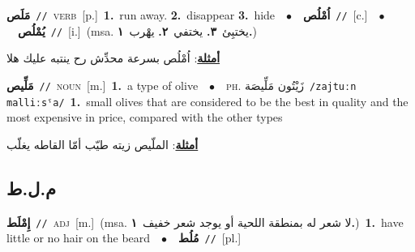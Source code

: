 \documentclass[10pt,a4paper,twoside]{article} %
\begin{document}
\begin{multicols}{2}
{\setlength\topsep{0pt}\textbf{\foreignlanguage{arabic}{مَلَص}}\ {\color{gray}\texttt{//}\color{black}}\ \textsc{verb}\ [p.]\ \textbf{1.}~run away.  \textbf{2.}~disappear  \textbf{3.}~hide\ \ $\bullet$\ \ \setlength\topsep{0pt}\textbf{\foreignlanguage{arabic}{اُمْلُص}}\ {\color{gray}\texttt{//}\color{black}}\ [c.]\ \ $\bullet$\ \ \setlength\topsep{0pt}\textbf{\foreignlanguage{arabic}{يُمْلُص}}\ {\color{gray}\texttt{//}\color{black}}\ [i.]\ \color{gray}(msa. \foreignlanguage{arabic}{يختبِئ}~\foreignlanguage{arabic}{\textbf{٣.}}  \foreignlanguage{arabic}{يختفي}~\foreignlanguage{arabic}{\textbf{٢.}}  \foreignlanguage{arabic}{يهْرب}~\foreignlanguage{arabic}{\textbf{١.}})\color{black}\  \begin{flushright}\color{gray}\foreignlanguage{arabic}{\textbf{\underline{\foreignlanguage{arabic}{أمثلة}}}: اُمْلُص بسرعة محدِّش رح ينتبه عليك هلا}\end{flushright}\color{black}} \vspace{2mm}

{\setlength\topsep{0pt}\textbf{\foreignlanguage{arabic}{مَلِّيص}}\ {\color{gray}\texttt{//}\color{black}}\ \textsc{noun}\ [m.]\ \textbf{1.}~a type of olive\ \ $\bullet$\ \ \textsc{ph.} \color{gray} \foreignlanguage{arabic}{زَيْتُون مَلِّيصَة}\color{black}\ {\color{gray}\texttt{/{\sffamily zajtuːn malliːsˤa}/}\color{black}}\ \textbf{1.}~small olives that are considered to be the best in quality and the most expensive in price, compared with the other types\  \begin{flushright}\color{gray}\foreignlanguage{arabic}{\textbf{\underline{\foreignlanguage{arabic}{أمثلة}}}: الملّيص زيته طيّب أمّا القاطه يغلّب}\end{flushright}\color{black}} \vspace{2mm}

\vspace{-3mm}
\subsection*{\color{blue}\foreignlanguage{arabic}{م.ل.ط}\color{blue}{}} 

{\setlength\topsep{0pt}\textbf{\foreignlanguage{arabic}{إِمْلَط}}\ {\color{gray}\texttt{//}\color{black}}\ \textsc{adj}\ [m.]\ \color{gray}(msa. \foreignlanguage{arabic}{لا شعر له بمنطقة اللحية أو يوجد شعر خفيف}~\foreignlanguage{arabic}{\textbf{١.}})\color{black}\ \textbf{1.}~have little or no hair on the beard\ \ $\bullet$\ \ \setlength\topsep{0pt}\textbf{\foreignlanguage{arabic}{مُلُط}}\ {\color{gray}\texttt{//}\color{black}}\ [pl.]\ } \vspace{2mm}


\end{multicols}
\end{document}
